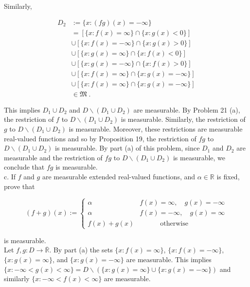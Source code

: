 \documentclass[a4paper]{article}
\begin{document}
Similarly,

\begin{align*}
D_2 &:= \{x : (fg)(x) = -\infty\}\\
&=[\{x : f(x) = \infty\} \cap \{x : g(x) < 0\}]\\
&\cup [\{x : f(x) = -\infty\} \cap \{x : g(x) > 0\}]\\
&\cup [\{x : g(x) = \infty\} \cap \{x : f(x) < 0\}]\\
&\cup [\{x : g(x) = -\infty\} \cap \{x : f(x) > 0\}]\\
&\cup [\{x : f(x) = \infty\} \cap \{x : g(x) = -\infty\}]\\
&\cup [\{x : f(x) = \infty\} \cap \{x : g(x) = -\infty\}]\\
& \in \mathfrak{M} \;.
\end{align*}

This implies $D_1 \cup D_2$ and $D \backslash (D_1 \cup D_2)$ are measurable. By Problem 21 (a), the restriction of $f$ to $D \backslash (D_1 \cup D_2)$ is measurable. Similarly, the restriction of $g$ to $D \backslash (D_1 \cup D_2)$ is measurable. Moreover, these restrictions are measurable real-valued functions and so by Proposition 19, the restriction of $fg$ to $D \backslash (D_1 \cup D_2)$ is measurable. By part (a) of this problem, since $D_1$ and $D_2$ are measurable and the restriction of $fg$ to $D \backslash (D_1 \cup D_2)$ is measurable, we conclude that $fg$ is measurable. \\

c. If $f$ and $g$ are measurable extended real-valued functions, and $\alpha \in \mathbb{R}$ is fixed, prove that

$$
(f+g)(x) := \begin{cases}
\alpha & f(x) = \infty, \quad g(x) = -\infty \\
\alpha & f(x) = -\infty, \quad g(x) = \infty \\
f(x) + g(x) & \quad \quad \quad \text{otherwise}
\end{cases} $$

is measurable. \\

Let $f,g : D \rightarrow \overline{\mathbb{R}}$. By part (a) the sets $\{x : f(x) = \infty\}$, $\{x : f(x) = -\infty\}$, $\{x : g(x) = \infty\}$, and $\{x : g(x) = -\infty\}$ are measurable. This implies $\{x : -\infty < g(x) < \infty\} = D \backslash (\{x : g(x) = \infty\} \cup \{x : g(x) = -\infty\})$ and similarly $\{x : -\infty < f(x) < \infty\}$ are measurable.
\end{document}
